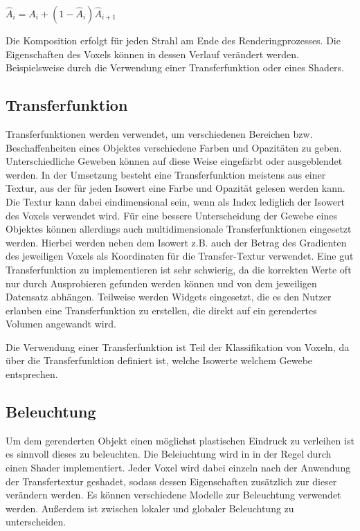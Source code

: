 $\hat{A}_{i}=A_{i}+(1-\hat{A}_{i})\hat{A}_{i+1}$

Die Komposition erfolgt für jeden Strahl am Ende des Renderingprozesses. Die Eigenschaften des Voxels können in dessen Verlauf verändert werden. Beispielsweise durch die Verwendung einer Transferfunktion oder eines Shaders.

\subsection{Transferfunktion}

Transferfunktionen werden verwendet, um verschiedenen Bereichen bzw. Beschaffenheiten eines Objektes verschiedene Farben und Opazitäten zu geben. Unterschiedliche Geweben können auf diese Weise eingefärbt oder ausgeblendet werden. In der Umsetzung besteht eine Transferfunktion meistens aus einer Textur, aus der für jeden Isowert eine Farbe und Opazität gelesen werden kann. Die Textur kann dabei eindimensional sein, wenn als Index lediglich der Isowert des Voxels verwendet wird. Für eine bessere Unterscheidung der Gewebe eines Objektes können allerdings auch multidimensionale Transferfunktionen eingesetzt werden. Hierbei werden neben dem Isowert z.B. auch der Betrag des Gradienten des jeweiligen Voxels als Koordinaten für die Transfer-Textur verwendet. Eine gut Transferfunktion zu implementieren ist sehr schwierig, da die korrekten Werte oft nur durch Ausprobieren gefunden werden können und von dem jeweiligen Datensatz abhängen. Teilweise werden Widgets eingesetzt, die es den Nutzer erlauben eine Transferfunktion zu erstellen, die direkt auf ein gerendertes Volumen angewandt wird.

Die Verwendung einer Transferfunktion ist Teil der Klassifikation von Voxeln, da über die Transferfunktion definiert ist, welche Isowerte welchem Gewebe entsprechen.

\subsection{Beleuchtung}
\label{beleuchtung}

Um dem gerenderten Objekt einen möglichst plastischen Eindruck zu verleihen ist es sinnvoll dieses zu beleuchten. Die Beleiuchtung wird in in der Regel durch einen Shader implementiert. Jeder Voxel wird dabei einzeln nach der Anwendung der Transfertextur geshadet, sodass dessen Eigenschaften zusätzlich zur dieser verändern werden. Es können verschiedene Modelle zur Beleuchtung verwendet werden. Außerdem ist zwischen lokaler und globaler Beleuchtung zu unterscheiden.

